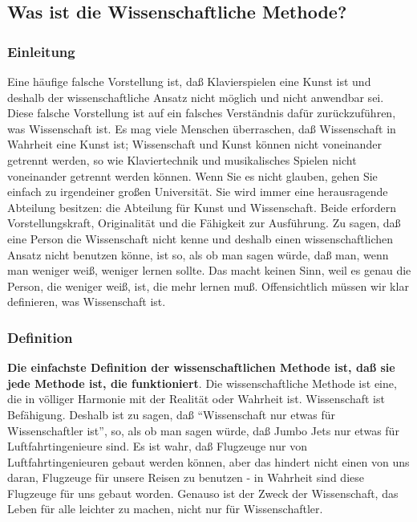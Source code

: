 
\subsection{Was ist die Wissenschaftliche Methode?}
\label{c3_3}

\subsubsection{Einleitung}
\label{c3_3a}

Eine häufige falsche Vorstellung ist, daß Klavierspielen eine Kunst ist und deshalb der wissenschaftliche Ansatz nicht möglich und nicht anwendbar sei.
Diese falsche Vorstellung ist auf ein falsches Verständnis dafür zurückzuführen, was Wissenschaft ist.
Es mag viele Menschen überraschen, daß Wissenschaft in Wahrheit eine Kunst ist; Wissenschaft und Kunst können nicht voneinander getrennt werden, so wie Klaviertechnik und musikalisches Spielen nicht voneinander getrennt werden können.
Wenn Sie es nicht glauben, gehen Sie einfach zu irgendeiner großen Universität.
Sie wird immer eine herausragende Abteilung besitzen: die Abteilung für Kunst und Wissenschaft.
Beide erfordern Vorstellungskraft, Originalität und die Fähigkeit zur Ausführung.
Zu sagen, daß eine Person die Wissenschaft nicht kenne und deshalb einen wissenschaftlichen Ansatz nicht benutzen könne, ist so, als ob man sagen würde, daß man, wenn man weniger weiß, weniger lernen sollte.
Das macht keinen Sinn, weil es genau die Person, die weniger weiß, ist, die mehr lernen muß.
Offensichtlich müssen wir klar definieren, was Wissenschaft ist.


\subsubsection{Definition}
\label{c3_3b}

\textbf{Die einfachste Definition der wissenschaftlichen Methode ist, daß sie jede Methode ist, die funktioniert}.
Die wissenschaftliche Methode ist eine, die in völliger Harmonie mit der Realität oder Wahrheit ist.
Wissenschaft ist Befähigung.
Deshalb ist zu sagen, daß \enquote{Wissenschaft nur etwas für Wissenschaftler ist}, so, als ob man sagen würde, daß Jumbo Jets nur etwas für Luftfahrtingenieure sind.
Es ist wahr, daß  Flugzeuge nur von Luftfahrtingenieuren gebaut werden können, aber das hindert nicht einen von uns daran, Flugzeuge für unsere Reisen zu benutzen - in Wahrheit sind diese Flugzeuge für uns gebaut worden.
Genauso ist der Zweck der Wissenschaft, das Leben für alle leichter zu machen, nicht nur für Wissenschaftler.

